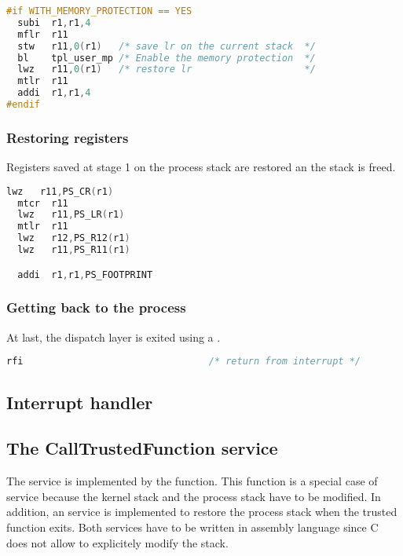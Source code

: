 \begin{lstlisting}[language=C]
#if WITH_MEMORY_PROTECTION == YES
  subi  r1,r1,4
  mflr  r11
  stw   r11,0(r1)   /* save lr on the current stack  */
  bl    tpl_user_mp /* Enable the memory protection  */
  lwz   r11,0(r1)   /* restore lr                    */
  mtlr  r11
  addi  r1,r1,4
#endif
\end{lstlisting}

\subsubsection{Restoring registers}

Registers saved at stage 1 on the process stack are restored an the stack is freed.

\begin{lstlisting}[language=C]
  lwz   r11,PS_CR(r1)
  mtcr  r11
  lwz   r11,PS_LR(r1)
  mtlr  r11
  lwz   r12,PS_R12(r1)
  lwz   r11,PS_R11(r1)

  addi  r1,r1,PS_FOOTPRINT
\end{lstlisting}

\subsubsection{Getting back to the process}

At last, the dispatch layer is exited using a .

\begin{lstlisting}[language=C]
  rfi                                 /* return from interrupt */
\end{lstlisting}

\subsection{Interrupt handler}

\subsection{The CallTrustedFunction service}

The  service is implemented by the  function. This function is a special case of service because the kernel stack and the process stack have to be modified. In addition, an  service is implemented to restore the process stack when the trusted function exits. Both services have to be written in assembly language since C does not allow to explicitely modify the stack.

